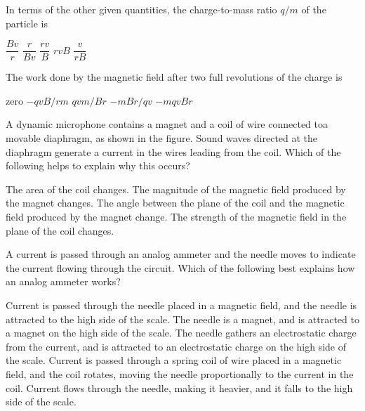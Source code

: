 \documentclass{../../../oss-ap12ibhl}
\begin{document}
\begin{questions}
  \question In terms of the other given quantities, the charge-to-mass ratio
  $q/m$ of the particle is
  \begin{choices}
    \choice $\dfrac{Bv}{r}$
    \choice $\dfrac{r}{Bv}$
    \choice $\dfrac{rv}{B}$
    \choice $rvB$
    \choice $\dfrac{v}{rB}$
  \end{choices}
  \label{q:circ1}
    
  \question The work done by the magnetic field after two full revolutions of
  the charge is
  \begin{choices}
    \choice zero
    \choice $-qvB/rm$
    \choice $qvm/Br$
    \choice $-mBr/qv$
    \choice $-mqvBr$
  \end{choices}
  \label{q:circ2}
%    
  \question A dynamic microphone contains a magnet and a coil of wire connected
  toa movable diaphragm, as shown in the figure. Sound waves directed at the
  diaphragm generate a current in the wires leading from the coil. Which of
  the following helps to explain why this occurs?

  \begin{minipage}{.5\linewidth}
  \end{minipage}
  \begin{minipage}{.49\linewidth}
    \begin{choices}
      \choice The area of the coil changes.
      \choice The magnitude of the magnetic field produced by the magnet
      changes.
      \choice The angle between the plane of the coil and the magnetic field
      produced by the magnet change.
      \choice The strength of the magnetic field in the plane of the coil
      changes.
    \end{choices}
  \end{minipage}

  \question A current is passed through an analog ammeter and the needle moves
  to indicate the current flowing through the circuit. Which of the
  following best explains how an analog ammeter works?
  \begin{choices}
    \choice Current is passed through the needle placed in a magnetic field,
    and the needle is attracted to the high side of the scale.
    \choice The needle is a magnet, and is attracted to a magnet on the high
    side of the scale.
    \choice The needle gathers an electrostatic charge from the current, and is
    attracted to an electrostatic charge on the high side of the scale.
    \choice Current is passed through a spring coil of wire placed in a
    magnetic field, and the coil rotates, moving the needle
    proportionally to the current in the coil.
    \choice Current flows through the needle, making it heavier, and it falls to
    the high side of the scale.
  \end{choices}
  \vspace{.7in}
    

\end{questions}
\end{document}
